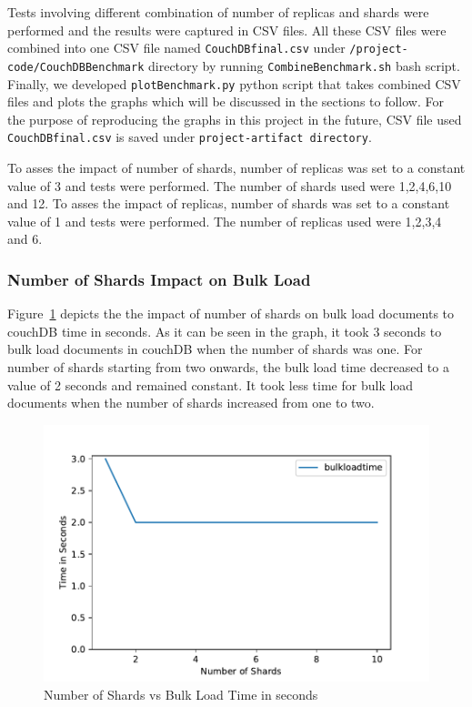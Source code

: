Tests involving different combination of number of replicas and shards
were performed and the results were captured in CSV files. All these
CSV files were combined into one CSV file named \verb|CouchDBfinal.csv| under
\verb|/project-code/CouchDBBenchmark| directory by running
\verb|CombineBenchmark.sh| bash script. Finally, we developed
\verb|plotBenchmark.py| python script that takes combined CSV files and plots
the graphs which will be discussed in the sections to follow. For the
purpose of reproducing the graphs in this project in the future, CSV file used
\verb|CouchDBfinal.csv| is saved under \verb|project-artifact directory|. 

To asses the impact of number of shards, number of replicas was set to a
constant value of 3 and tests were performed. The number of shards
used were 1,2,4,6,10 and 12. To asses the impact of replicas, number
of shards was set to a constant value of 1 and tests were
performed. The number of replicas used were 1,2,3,4 and 6.



\subsubsection{Number of Shards Impact on Bulk Load}


Figure~\ref{f:shard-bulk} depicts the the impact of number of shards
on bulk load documents to couchDB time in seconds. As it can be seen
in the graph, it took 3 seconds to bulk load documents in couchDB when
the number of shards was one. For number of shards starting from
two onwards, the bulk load time decreased to a value of 2 seconds and remained
constant. It took less time for bulk load documents when the number of
shards increased from one to two.

\begin{figure}[!ht]
  \centering\includegraphics[width=\columnwidth]{../images/ShardsBulkLoad.pdf}
  \caption{Number of Shards vs Bulk Load Time in seconds }\label{f:shard-bulk}
\end{figure}



